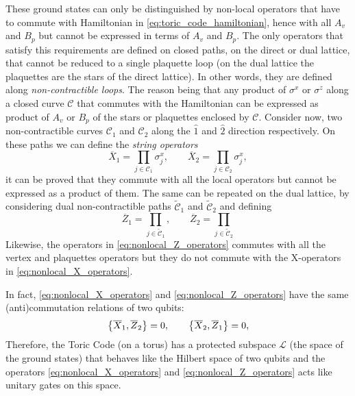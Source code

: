 These ground states can only be distinguished by non-local operators that have to commute with Hamiltonian in \eqref{eq:toric_code_hamiltonian}, hence with all $A_v$ and $B_p$ but cannot be expressed in terms of $A_v$ and $B_p$.
The only operators that satisfy this requirements are defined on closed paths, on the direct or dual lattice, that cannot be reduced to a single plaquette loop (on the dual lattice the plaquettes are the stars of the direct lattice).
In other words, they are defined along \emph{non-contractible loops}.
The reason being that any product of $\sigma^x$ or $\sigma^z$ along a closed curve $\mathcal{C}$ that commutes with the Hamiltonian can be expressed as product of $A_v$ or $B_p$ of the stars or plaquettes enclosed by $\mathcal{C}$.
Consider now, two non-contractible curves $\mathcal{C}_{1}$ and $\mathcal{C}_{2}$ along the $\hat{1}$ and $\hat{2}$ direction respectively.
On these paths we can define the \emph{string operators}
\begin{equation}
    \overline{X}_1 = \prod_{j \in \mathcal{C}_1}  \sigma^x_j, \qquad
    \overline{X}_2 = \prod_{j \in \mathcal{C}_2}  \sigma^x_j,
    \label{eq:nonlocal_X_operators}
\end{equation}
it can be proved that they commute with all the local operators but cannot be expressed as a product of them.
The same can be repeated on the dual lattice, by considering dual non-contractible paths $\tilde{\mathcal{C}}_1$ and $\tilde{\mathcal{C}}_2$ and defining
\begin{equation}
    \overline{Z}_1 = \prod_{j \in \mathcal{\tilde{C}}_1}, \qquad
    \overline{Z}_2 = \prod_{j \in \mathcal{\tilde{C}}_2}
    \label{eq:nonlocal_Z_operators}
\end{equation}
Likewise, the operators in \eqref{eq:nonlocal_Z_operators} commutes with all the vertex and plaquettes operators but they do not commute with the X-operators in \eqref{eq:nonlocal_X_operators}.

In fact, \eqref{eq:nonlocal_X_operators} and \eqref{eq:nonlocal_Z_operators} have the same (anti)commutation relations of two qubits:
\begin{equation}
    \qty{ \overline{X}_1, \overline{Z}_2 } = 0, \qquad
    \qty{ \overline{X}_2, \overline{Z}_1 } = 0,
\end{equation}
Therefore, the Toric Code (on a torus) has a protected subspace $\mathcal{L}$ (the space of the ground states) that behaves like the Hilbert space of two qubits and the operators \eqref{eq:nonlocal_X_operators} and \eqref{eq:nonlocal_Z_operators} acts like unitary gates on this space.

